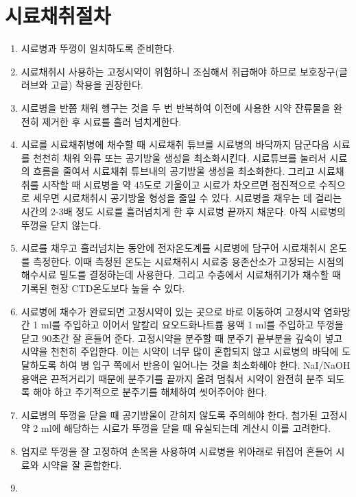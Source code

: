 \documentclass[
]{book}
\providecommand{\tightlist}{%
  \setlength{\itemsep}{0pt}\setlength{\parskip}{0pt}}
\begin{document}
\hypertarget{uxc2dcuxb8ccuxcc44uxcde8uxc808uxcc28}{%
\section{시료채취절차}\label{uxc2dcuxb8ccuxcc44uxcde8uxc808uxcc28}}

\begin{enumerate}
\def\labelenumi{\arabic{enumi}.}
\tightlist
\item
  시료병과 뚜껑이 일치하도록 준비한다.
\item
  시료채취시 사용하는 고정시약이 위험하니 조심해서 취급해야 하므로 보호장구(글러브와 고글) 착용을 권장한다.
\item
  시료병을 반쯤 채워 헹구는 것을 두 번 반복하여 이전에 사용한 시약 잔류물을 완전히 제거한 후 시료를 흘러 넘치게한다.
\item
  시료를 시료채취병에 채수할 때 시료채취 튜브를 시료병의 바닥까지 담군다음 시료를 천천히 채워 와류 또는 공기방울 생성을 최소화시킨다. 시료튜브를 눌러서 시료의 흐름을 줄여서 시료채취 튜브내의 공기방울 생성을 최소화한다. 그리고 시료채취를 시작할 때 시료병을 약 45도로 기울이고 시료가 차오르면 점진적으로 수직으로 세우면 시료채취시 공기방울 형성을 줄일 수 있다. 시료병을 채우는 데 걸리는 시간의 2-3배 정도 시료를 흘러넘치게 한 후 시료병 끝까지 채운다. 아직 시료병의 뚜껑을 닫지 않는다.
\item
  시료를 채우고 흘러넘치는 동안에 전자온도계를 시료병에 담구어 시료채취시 온도를 측정한다. 이때 측정된 온도는 시료채취시 시료중 용존산소가 고정되는 시점의 해수시료 밀도를 결정하는데 사용한다. 그리고 수층에서 시료채취기가 채수할 때 기록된 현장 CTD온도보다 높을 수 있다.
\item
  시료병에 채수가 완료되면 고정시약이 있는 곳으로 바로 이동하여 고정시약 염화망간 1 ml를 주입하고 이어서 알칼리 요오드화나트륨 용액 1 ml를 주입하고 뚜껑을 닫고 90초간 잘 흔들어 준다. 고정시약을 분주할 때 분주기 끝부분을 깊숙이 넣고 시약을 천천히 주입한다. 이는 시약이 너무 많이 혼합되지 않고 시료병의 바닥에 도달하도록 하여 병 입구 쪽에서 반응이 일어나는 것을 최소화해야 한다. NaI/NaOH 용액은 끈적거리기 때문에 분주기를 끝까지 올려 멈춰서 시약이 완전히 분주 되도록 해야 하고 주기적으로 분주기를 해체하여 씻어주어야 한다.
\item
  시료병의 뚜껑을 닫을 때 공기방울이 갇히지 않도록 주의해야 한다. 첨가된 고정시약 2 ml에 해당하는 시료가 뚜껑을 닫을 때 유실되는데 계산시 이를 고려한다.
\item
  엄지로 뚜껑을 잘 고정하여 손목을 사용하여 시료병을 위아래로 뒤집어 흔들어 시료와 시약을 잘 혼합한다.
\item

\end{enumerate}
\end{document}
